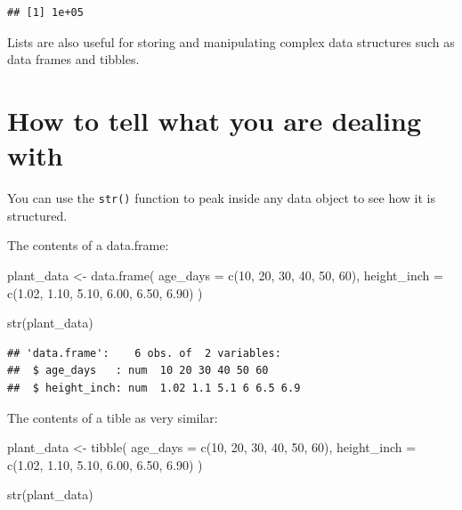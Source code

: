 \documentclass[
]{book}
\newenvironment{Shaded}{\begin{snugshade}}{\end{snugshade}}
\newcommand{\AttributeTok}[1]{\textcolor[rgb]{0.77,0.63,0.00}{#1}}
\newcommand{\DecValTok}[1]{\textcolor[rgb]{0.00,0.00,0.81}{#1}}
\newcommand{\FloatTok}[1]{\textcolor[rgb]{0.00,0.00,0.81}{#1}}
\newcommand{\FunctionTok}[1]{\textcolor[rgb]{0.00,0.00,0.00}{#1}}
\newcommand{\NormalTok}[1]{#1}
\newcommand{\OtherTok}[1]{\textcolor[rgb]{0.56,0.35,0.01}{#1}}
\begin{document}
\begin{verbatim}
## [1] 1e+05
\end{verbatim}

Lists are also useful for storing and manipulating complex data structures such as data frames and tibbles.

\hypertarget{how-to-tell-what-you-are-dealing-with}{%
\section{How to tell what you are dealing with}\label{how-to-tell-what-you-are-dealing-with}}

You can use the \texttt{str()} function to peak inside any data object to see how it is structured.

The contents of a data.frame:

\begin{Shaded}
\begin{Highlighting}[]
\NormalTok{plant\_data }\OtherTok{\textless{}{-}} \FunctionTok{data.frame}\NormalTok{(}
  \AttributeTok{age\_days =} \FunctionTok{c}\NormalTok{(}\DecValTok{10}\NormalTok{, }\DecValTok{20}\NormalTok{, }\DecValTok{30}\NormalTok{, }\DecValTok{40}\NormalTok{, }\DecValTok{50}\NormalTok{, }\DecValTok{60}\NormalTok{),}
  \AttributeTok{height\_inch =} \FunctionTok{c}\NormalTok{(}\FloatTok{1.02}\NormalTok{, }\FloatTok{1.10}\NormalTok{, }\FloatTok{5.10}\NormalTok{, }\FloatTok{6.00}\NormalTok{, }\FloatTok{6.50}\NormalTok{, }\FloatTok{6.90}\NormalTok{)}
\NormalTok{)}

\FunctionTok{str}\NormalTok{(plant\_data)}
\end{Highlighting}
\end{Shaded}

\begin{verbatim}
## 'data.frame':    6 obs. of  2 variables:
##  $ age_days   : num  10 20 30 40 50 60
##  $ height_inch: num  1.02 1.1 5.1 6 6.5 6.9
\end{verbatim}

The contents of a tible as very similar:

\begin{Shaded}
\begin{Highlighting}[]
\NormalTok{plant\_data }\OtherTok{\textless{}{-}} \FunctionTok{tibble}\NormalTok{(}
  \AttributeTok{age\_days =} \FunctionTok{c}\NormalTok{(}\DecValTok{10}\NormalTok{, }\DecValTok{20}\NormalTok{, }\DecValTok{30}\NormalTok{, }\DecValTok{40}\NormalTok{, }\DecValTok{50}\NormalTok{, }\DecValTok{60}\NormalTok{),}
  \AttributeTok{height\_inch =} \FunctionTok{c}\NormalTok{(}\FloatTok{1.02}\NormalTok{, }\FloatTok{1.10}\NormalTok{, }\FloatTok{5.10}\NormalTok{, }\FloatTok{6.00}\NormalTok{, }\FloatTok{6.50}\NormalTok{, }\FloatTok{6.90}\NormalTok{)}
\NormalTok{)}

\FunctionTok{str}\NormalTok{(plant\_data)}
\end{Highlighting}
\end{Shaded}
\end{document}
